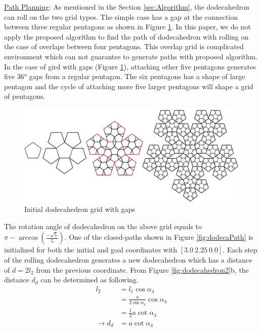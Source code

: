 \noindent\uline{Path Planning}: As mentioned in the Section \ref{sec:Algorithm}, the dodecahedron can roll on the two grid types. 
The simple case has a gap at the connection between three regular pentagons as shown in Figure \ref{fig:dodecaGrid}. 
%
In this paper, we do not apply the proposed algorithm to find the path of dodecahedron with rolling on the case of overlaps between four pentagons. 
This overlap grid is complicated environment which can not guarantee to generate paths with proposed algorithm. 
%
In the case of gird with gaps (Figure \ref{fig:dodecaGrid}), attaching other five pentagons generates five $\ang{36}$ gaps from a regular pentagon. 
The six pentagons has a shape of large pentagon and the cycle of attaching more five larger pentagons will shape a grid of pentagons.
%
\begin{figure}[H]
\centering
	\includegraphics[width=\textwidth]{image/dodecaGrid.png}
	\caption{Initial dodecahedron grid with gaps}
	\label{fig:dodecaGrid}
\end{figure}
\noindent The rotation angle of dodecahedron on the above grid equals 
to $\pi-\arccos{(\frac{-\sqrt{5}}{5})}$. 
One of the closed-paths shown in Figure \ref{fig:dodecaPath} is initialized for both the initial and goal coordinates with $[3.0\ 2.25\ 0.0]$.
Each step of the rolling dodecahedron generates a new dodecahedron which has a distance of $d=2l_2$ from the previous coordinate. 
From Figure \ref{fig:dodecahedron2}b, the distance $d_d$ can be determined as following.
\begin{equation*} 
\label{dodeca:eq4}
\begin{split}
l_2 & = l_1\cos{\alpha_4}\\
    & = \frac{a}{2\sin{\alpha_4}}\cos{\alpha_4}\\
    & = \frac{1}{2}a\cot{\alpha_4}\\
\rightarrow d_d & = a\cot{\alpha_4}
\end{split}
\end{equation*}

